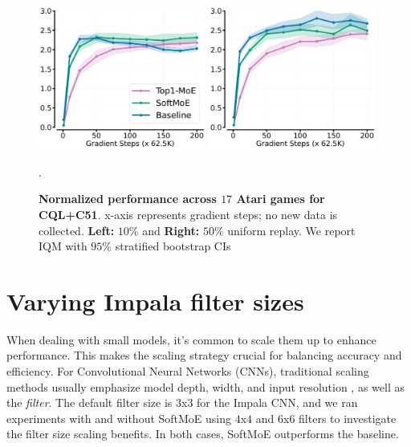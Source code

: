 \begin{figure}[!h]
    \centering
    \includegraphics[width=0.49\textwidth]{figures/MOEs_offlineCQL+C51_experts_8CORRCOLOR_10percentage.pdf}
    \includegraphics[width=0.49\textwidth]{figures/MOEs_offlineCQL+C51_experts_8CORRCOLOR_50percentage.pdf}
    \caption{\textbf{Normalized performance across $17$ Atari games for CQL+C51}. x-axis represents gradient steps; no new data is collected. \textbf{Left:} $10\%$ and \textbf{Right:} $50\%$ uniform replay. We report IQM with $95\%$ stratified bootstrap CIs \citep{agarwal2021deep}}.
    \label{append:data_percentage}
\end{figure}


\newpage
\clearpage
\section{Varying Impala filter sizes}

When dealing with small models, it's common to scale them up to enhance performance. This makes the scaling strategy crucial for balancing accuracy and efficiency. For Convolutional Neural Networks (CNNs), traditional scaling methods usually emphasize model depth, width, and input resolution \citep{ding2022scaling}, as well as the \textit{filter}. The default filter size is $3$x$3$ for the Impala CNN, and we ran experiments with and without SoftMoE using $4$x$4$ and $6$x$6$ filters to investigate the filter size scaling benefits. In both cases, SoftMoE outperforms the baseline.


